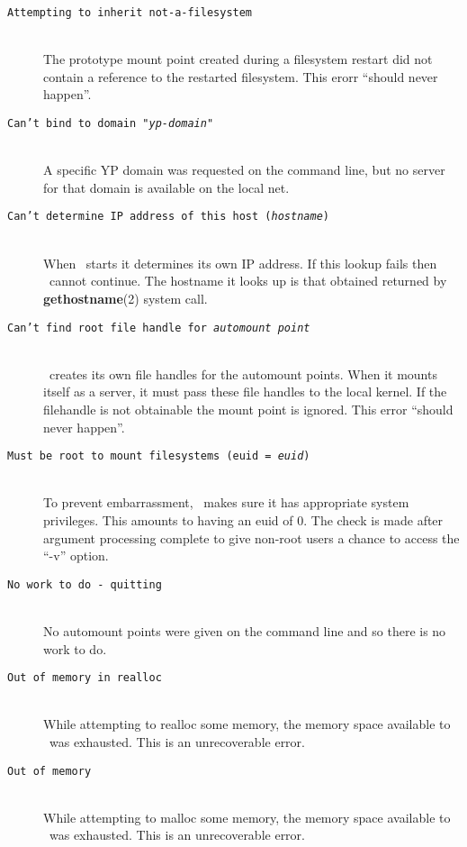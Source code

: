 \begin{description}
\item [\tt Attempting to inherit not-a-filesystem]\mbox{}\\
The prototype mount point created during a filesystem restart
did not contain a reference to the restarted filesystem.
This erorr ``should never happen''.

\item [\tt Can't bind to domain "{\em yp-domain}"]\mbox{}\\
A specific YP domain was requested on the command line, but no
server for that domain is available on the local net.

\item [\tt Can't determine IP address of this host ({\em hostname})]\mbox{}\\
When \amd\ starts it determines its own IP address.
If this lookup fails then \amd\ cannot continue.
The hostname it looks up is that obtained returned by
{\bf gethostname}(2) system call.

\item [\tt Can't find root file handle for {\em automount point}]\mbox{}\\
\Amd\ creates its own file handles for the automount points.
When it mounts itself as a server, it must pass these
file handles to the local kernel.
If the filehandle is not obtainable the mount point is ignored.
This error ``should never happen''.

\item [\tt Must be root to mount filesystems (euid = {\em euid})]\mbox{}\\
To prevent embarrassment, \amd\ makes sure it has appropriate
system privileges.  This amounts to having an euid of 0.
The check is made after argument processing complete to
give non-root users a chance to access the ``-v'' option.

\item [\tt No work to do - quitting]\mbox{}\\
No automount points were given on the command line and so
there is no work to do.

\item [\tt Out of memory in realloc]\mbox{}\\
While attempting to realloc some memory, the memory space
available to \amd\ was exhausted.  This is an unrecoverable
error.

\item [\tt Out of memory]\mbox{}\\
While attempting to malloc some memory, the memory space
available to \amd\ was exhausted.  This is an unrecoverable
error.


\end{description}
